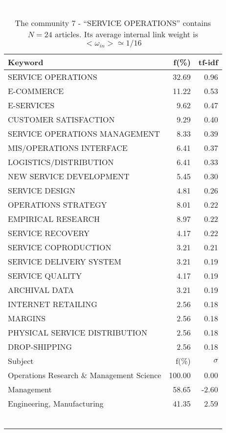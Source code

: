 \documentclass[a4paper,11pt]{report}
\begin{document}
\begin{landscape}
\clearpage

\begin{table}[!ht]
\caption{The community 7 - ``SERVICE OPERATIONS'' contains $N = 24$ articles. Its average internal link weight is $<\omega_{in}> \simeq 1/16$ }
\textcolor{white}{aa}\\
{\scriptsize\begin{tabular}{|l r  r|}
\hline
Keyword & f(\%) & tf-idf \\
\hline
SERVICE OPERATIONS & 32.69 & 0.96\\
E-COMMERCE & 11.22 & 0.53\\
E-SERVICES & 9.62 & 0.47\\
CUSTOMER SATISFACTION & 9.29 & 0.40\\
SERVICE OPERATIONS MANAGEMENT & 8.33 & 0.39\\
MIS/OPERATIONS INTERFACE & 6.41 & 0.37\\
LOGISTICS/DISTRIBUTION & 6.41 & 0.33\\
NEW SERVICE DEVELOPMENT & 5.45 & 0.30\\
SERVICE DESIGN & 4.81 & 0.26\\
OPERATIONS STRATEGY & 8.01 & 0.22\\
EMPIRICAL RESEARCH & 8.97 & 0.22\\
SERVICE RECOVERY & 4.17 & 0.22\\
SERVICE COPRODUCTION & 3.21 & 0.21\\
SERVICE DELIVERY SYSTEM & 3.21 & 0.19\\
SERVICE QUALITY & 4.17 & 0.19\\
ARCHIVAL DATA & 3.21 & 0.19\\
INTERNET RETAILING & 2.56 & 0.18\\
MARGINS & 2.56 & 0.18\\
PHYSICAL SERVICE DISTRIBUTION & 2.56 & 0.18\\
DROP-SHIPPING & 2.56 & 0.18\\
\hline
\hline
Subject & f(\%) & $\sigma$\\
\hline
Operations Research \& Management Science & 100.00 & 0.00\\
Management & 58.65 & -2.60\\
Engineering, Manufacturing & 41.35 & 2.59\\
 &  & \\
 &  & \\
 &  & \\
 &  & \\
 &  & \\
 &  & \\

\end{tabular}}
\end{table}
\end{landscape}
\end{document}
